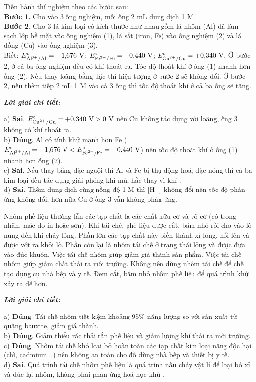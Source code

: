 \documentclass[11pt,a4paper]{article}
\def\loigiai#1{
\par\begingroup\color{blue!80!black}\small
\noindent\textbf{\textit{Lời giải chi tiết:}}\par
#1\par\endgroup}
\begin{document}
\begin{ex}
Tiến hành thí nghiệm theo các bước sau:\\
\textbf{Bước 1.} Cho vào 3 ống nghiệm, mỗi ống 2 mL dung dịch  1 M.\\
\textbf{Bước 2.} Cho 3 lá kim loại có kích thước như nhau gồm lá nhôm (Al) đã làm sạch lớp bề mặt vào ống nghiệm (1), lá sắt (iron, Fe) vào ống nghiệm (2) và lá đồng (Cu) vào ống nghiệm (3).\\
Biết: $E^\circ_{\ce{Al^3+/Al}} = -1{,}676\text{ V}$; $E^\circ_{\ce{Fe^2+/Fe}} = -0{,}440\text{ V}$; $E^\circ_{\ce{Cu^2+/Cu}} = +0{,}340\text{ V}$.
\choiceTF
{Ở bước 2, ở cả ba ống nghiệm đều có khí thoát ra.}
{\True Tốc độ thoát khí ở ống (1) nhanh hơn ống (2).}
{Nếu thay  loãng bằng  đặc thì hiện tượng ở bước 2 sẽ không đổi.}
{Ở bước 2, nếu thêm tiếp 2 mL  1 M vào cả 3 ống thì tốc độ thoát khí ở cả ba ống sẽ tăng.}
\loigiai{
a) \textbf{Sai}. $E^\circ_{\ce{Cu^2+/Cu}} = +0{,}340\text{ V} > 0\text{ V}$ nên Cu không tác dụng với \ce{H2SO4} loãng, ống 3 không có khí thoát ra.\\
b) \textbf{Đúng}. Al có tính khử mạnh hơn Fe ($E^\circ_{\ce{Al^3+/Al}} = -1{,}676\text{ V} < E^\circ_{\ce{Fe^2+/Fe}} = -0{,}440\text{ V}$) nên tốc độ thoát khí ở ống (1) nhanh hơn ống (2).\\
c) \textbf{Sai}. Nếu thay bằng \ce{H2SO4} đặc nguội thì Al và Fe bị thụ động hoá; đặc nóng thì cả ba kim loại đều tác dụng giải phóng khí \ce{SO2} mùi hắc thay vì khí \ce{H2}.\\
d) \textbf{Sai}. Thêm dung dịch cùng nồng độ 1 M thì $[\ce{H+}]$ không đổi nên tốc độ phản ứng không đổi; hơn nữa Cu ở ống 3 vẫn không phản ứng.}
\end{ex}

\begin{ex}
Nhôm phế liệu thường lẫn các tạp chất là các chất hữu cơ và vô cơ (có trong nhãn, mác do in hoặc sơn). Khi tái chế, phế liệu được cắt, băm nhỏ rồi cho vào lò nung đến khi chảy lỏng. Phần lớn các tạp chất này biến thành xỉ lỏng, nổi lên và được vớt ra khỏi lò. Phần còn lại là nhôm tái chế ở trạng thái lỏng và được đưa vào đúc khuôn.
\choiceTF
{\True Việc tái chế nhôm giúp giảm giá thành sản phẩm.}
{\True Việc tái chế nhôm giúp giảm chất thải ra môi trường.}
{\True Không nên dùng nhôm tái chế để chế tạo dụng cụ nhà bếp và y tế.}
{Đem cắt, băm nhỏ nhôm phế liệu để quá trình khử  xảy ra dễ hơn.}
\loigiai{
a) \textbf{Đúng}. Tái chế nhôm tiết kiệm khoảng 95\% năng lượng so với sản xuất từ quặng bauxite, giảm giá thành.\\
b) \textbf{Đúng}. Giảm thiểu rác thải rắn phế liệu và giảm lượng khí thải ra môi trường.\\
c) \textbf{Đúng}. Nhôm tái chế khó loại bỏ hoàn toàn các tạp chất kim loại nặng độc hại (chì, cadmium...) nên không an toàn cho đồ dùng nhà bếp và thiết bị y tế.\\
d) \textbf{Sai}. Quá trình tái chế nhôm phế liệu là quá trình nấu chảy vật lí để loại bỏ xỉ và đúc lại nhôm, không phải phản ứng hoá học khử \ce{Al2O3}.}
\end{ex}
\end{document}
